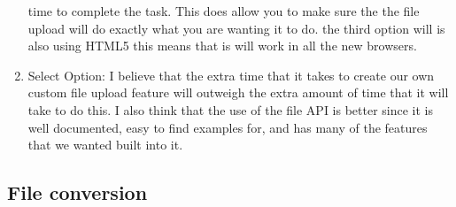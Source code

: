 \documentclass[letterpaper, 10pt, draftclsnofoot, compsoc, onecolumn]{IEEEtran}
\begin{document}
\begin{enumerate}
					time to complete the task. This does allow you to make sure the the file upload will do exactly what you are wanting it to do. the 
					third option will is also using HTML5 this means that is will work in all the new browsers.
			\item{Select Option:}
					 I believe that the extra time that it takes to create our own custom file upload feature will outweigh the extra amount of time 
					that it will take to do this. I also think that the use of the file API is better since it is well documented, easy to find examples
					for, and has many of the features that we wanted built into it.
		\end{enumerate}
	\subsection{File conversion}
\end{document}
